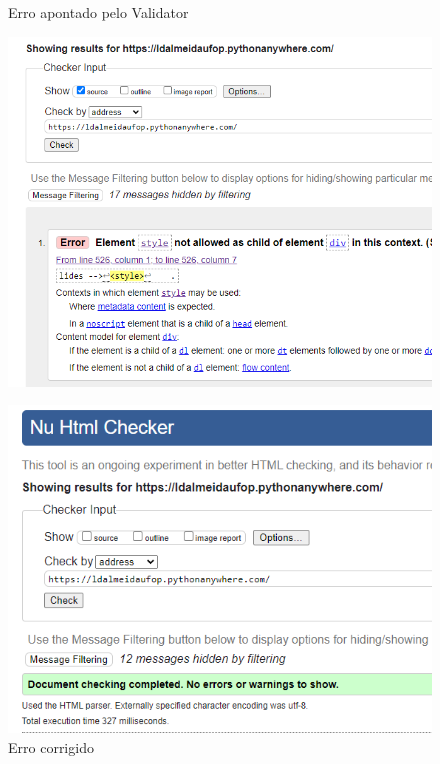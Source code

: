 \begin{figure}[htb]
    \label{teste}
    \centering
     \begin{minipage}{0.4\textwidth}
       \centering
       \caption{Erro apontado pelo Validator} \label{fig_validator_error}
       \includegraphics[scale=0.3]{./img/validator_error.png}
     \end{minipage}
     \hfill
     \begin{minipage}{0.4\textwidth}
        \centering
        \caption{Erro corrigido} \label{fig_validator_sucess}
        \includegraphics[scale=0.3]{./img/validator_sucess.png}
      \end{minipage}
   \end{figure}

